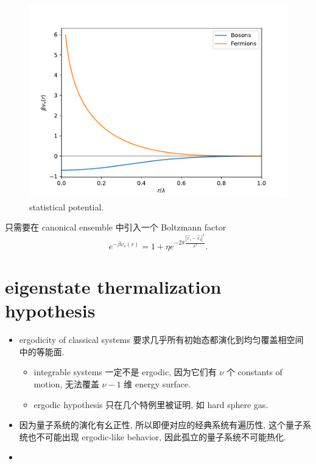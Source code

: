 \begin{itemize}
	\begin{figure}[H]
		\centering
		\includegraphics[scale=0.5]{figures/statistical potential.pdf}
		\caption{statistical potential.}
	\end{figure}
	
	\begin{tcolorbox}[title=proof:]
		只需要在 canonical ensemble 中引入一个 Boltzmann factor
		\begin{equation}
			e^{- \beta v_s(r)} = 1 + \eta e^{- 2 \pi \frac{|\vec{x}_1 - \vec{x}_2|^2}{\lambda^2}}.
		\end{equation}
	\end{tcolorbox}
\end{itemize}

\section{eigenstate thermalization hypothesis}
\begin{itemize}
	\item ergodicity of classical systems 要求几乎所有初始态都演化到均匀覆盖相空间中的等能面.
	\begin{itemize}
		\item integrable systems 一定不是 ergodic, 因为它们有 $\nu$ 个 constants of motion, 无法覆盖 $\nu - 1$ 维 energy surface.
		
		\item ergodic hypothesis 只在几个特例里被证明, 如 hard sphere gas.
	\end{itemize}
	
	\item 因为量子系统的演化有幺正性, 所以即便对应的经典系统有遍历性, 这个量子系统也不可能出现 ergodic-like behavior, 因此孤立的量子系统不可能热化.
	
	\item 
\end{itemize}
